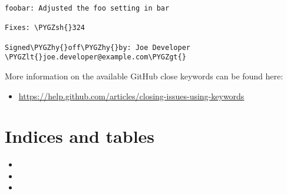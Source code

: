 \documentclass[letterpaper,10pt,english]{sphinxmanual}
\def\PYGZlt{\char`\<}
\def\PYGZgt{\char`\>}
\def\PYGZsh{\char`\#}
\def\PYGZhy{\char`\-}
\begin{document}
\begin{Verbatim}[commandchars=\\\{\}]
foobar: Adjusted the foo setting in bar

Fixes: \PYGZsh{}324

Signed\PYGZhy{}off\PYGZhy{}by: Joe Developer \PYGZlt{}joe.developer@example.com\PYGZgt{}
\end{Verbatim}

More information on the available GitHub close keywords can be found here:
\begin{itemize}
\item {} 
\href{https://help.github.com/articles/closing-issues-using-keywords}{https://help.github.com/articles/closing-issues-using-keywords}

\end{itemize}


\chapter{Indices and tables}
\label{index:indices-and-tables}\begin{itemize}
\item {} 

\item {} 

\item {} 

\end{itemize}



\renewcommand{\indexname}{Index}
\printindex
\end{document}
